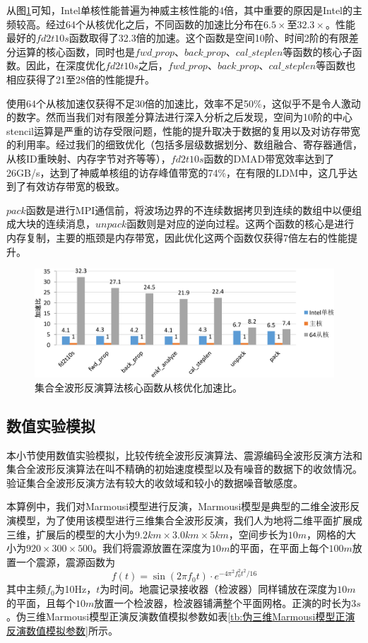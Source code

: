 \documentclass[degree=doctor]{thuthesis}
\begin{document}
从图\ref{fig:集合全波形反演算法核心函数从核优化加速比}可知，Intel单核性能普遍为神威主核性能的4倍，其中重要的原因是Intel的主频较高。经过64个从核优化之后，不同函数的加速比分布在$6.5\times$至$32.3\times$。性能最好的$fd2t10s$函数取得了32.3倍的加速。这个函数是空间10阶、时间2阶的有限差分运算的核心函数，同时也是$fwd\_prop$、$back\_prop$、$cal\_steplen$等函数的核心子函数。因此，在深度优化$fd2t10s$之后，$fwd\_prop$、$back\_prop$、$cal\_steplen$等函数也相应获得了21至28倍的性能提升。

使用64个从核加速仅获得不足30倍的加速比，效率不足50\%，这似乎不是令人激动的数字。然而当我们对有限差分算法进行深入分析之后发现，空间为10阶的中心stencil运算是严重的访存受限问题，性能的提升取决于数据的复用以及对访存带宽的利用率。经过我们的细致优化（包括多层级数据划分、数组融合、寄存器通信，从核ID重映射、内存字节对齐等等），$fd2t10s$函数的DMAD带宽效率达到了26GB/s，达到了神威单核组的访存峰值带宽的74\%，在有限的LDM中，这几乎达到了有效访存带宽的极致。

$pack$函数是进行MPI通信前，将波场边界的不连续数据拷贝到连续的数组中以便组成大块的连续消息，$unpack$函数则是对应的逆向过程。这两个函数的核心是进行内存复制，主要的瓶颈是内存带宽，因此优化这两个函数仅获得7倍左右的性能提升。

\begin{figure}[ht]
\centering
\includegraphics[width=0.9\columnwidth]{enfwi不同函数优化加速比-crop.pdf}
\caption{集合全波形反演算法核心函数从核优化加速比。}
\label{fig:集合全波形反演算法核心函数从核优化加速比}
\end{figure}



\subsection{数值实验模拟}
本小节使用数值实验模拟，比较传统全波形反演算法、震源编码全波形反演方法和集合全波形反演算法在叫不精确的初始速度模型以及有噪音的数据下的收敛情况。验证集合全波形反演方法有较大的收敛域和较小的数据噪音敏感度。

本算例中，我们对Marmousi模型进行反演，Marmousi模型是典型的二维全波形反演模型，为了使用该模型进行三维集合全波形反演，我们人为地将二维平面扩展成三维，扩展后的模型的大小为$9.2km\times 3.0km \times 5km$，空间步长为$10m$，网格的大小为$920\times 300 \times 500$。我们将震源放置在深度为$10m$的平面，在平面上每个$100m$放置一个震源，震源函数为
\begin{equation}
  f(t)=\sin(2\pi f_0t)\cdot e^{-4\pi^2f_0^2t^2/16}
\end{equation}
其中主频$f_0$为10Hz，$t$为时间。地震记录接收器（检波器）同样铺放在深度为$10m$的平面，且每个$10m$放置一个检波器，检波器铺满整个平面网格。正演的时长为$3s$。伪三维Marmousi模型正演反演数值模拟参数如表\ref{tb:伪三维Marmousi模型正演反演数值模拟参数}所示。
\end{document}
